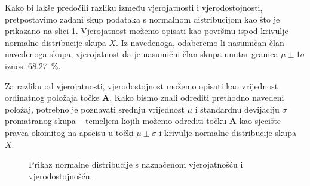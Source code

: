 \documentclass[a4paper,12pt,oneside]{memoir}
\begin{document}
                Kako bi lakše predočili razliku između vjerojatnosti i vjerodostojnosti, pretpostavimo zadani skup podataka s normalnom distribucijom kao što je prikazano na slici \ref{fig:31}. Vjerojatnost možemo opisati kao površinu ispod krivulje normalne distribucije skupa $X$. Iz navedenoga, odaberemo li nasumičan član navedenoga skupa, vjerojatnost da je nasumični član skupa unutar granica $\mu\pm1\sigma$ iznosi \SI{68.27}{\percent}.
                
                Za razliku od vjerojatnosti, vjerodostojnost možemo opisati kao vrijednost ordinatnog položaja točke $\mathbf{A}$. Kako bismo znali odrediti prethodno navedeni položaj, potrebno je poznavati srednju vrijednost $\mu$ i standardnu devijaciju $\sigma$ promatranog skupa -- temeljem kojih možemo odrediti točku $\mathbf{A}$ kao sjecište pravca okomitog na apscisu u točki $\mu\pm\sigma$ i krivulje normalne distribucije skupa $X$.

                \begin{figure}[H]
                    \centering
                    \caption{Prikaz normalne distribucije s naznačenom vjerojatnošću i vjerodostojnošću.}
                    \label{fig:31}
                \end{figure}
                
\end{document}
